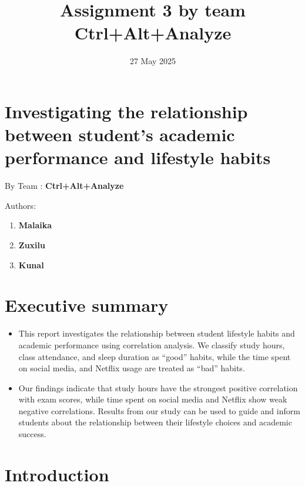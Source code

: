 \documentclass[
  11pt,
  a4paper,
]{article}
\title{Assignment 3 by team Ctrl+Alt+Analyze}
\date{27 May 2025}
\author{\sf{\Large\textbf{Malaika} \\[0.5cm]}{\Large\textbf{Kunal} \\[0.5cm]}{\Large\textbf{ZuxiLu} \\[0.5cm]}}
\makeatletter
\providecommand{\tightlist}{%
  \setlength{\itemsep}{0pt}\setlength{\parskip}{0pt}}\usepackage{longtable,booktabs,array}
\renewcommand*\contentsname{Table of contents}
\newcommand\contentsname{Table of contents}
\def\maketitle{\front{\expandafter{\@title}}{\@author}{\@organization}}
\makeatother
\begin{document}
\maketitle

\renewcommand*\contentsname{Table of contents}
{
\hypersetup{linkcolor=}
\setcounter{tocdepth}{3}
\tableofcontents
}

\newpage

\section{Investigating the relationship between student's academic
performance and lifestyle
habits}\label{investigating-the-relationship-between-students-academic-performance-and-lifestyle-habits}

By Team : \textbf{Ctrl+Alt+Analyze}

Authors:

\begin{enumerate}
\def\labelenumi{\arabic{enumi}.}
\item
  \textbf{Malaika}
\item
  \textbf{Zuxilu}
\item
  \textbf{Kunal}
\end{enumerate}

\section{Executive summary}\label{executive-summary}

\begin{itemize}
\tightlist
\item
  This report investigates the relationship between student lifestyle
  habits and academic performance using correlation analysis. We
  classify study hours, class attendance, and sleep duration as ``good''
  habits, while the time spent on social media, and Netflix usage are
  treated as ``bad'' habits.
\item
  Our findings indicate that study hours have the strongest positive
  correlation with exam scores, while time spent on social media and
  Netflix show weak negative correlations. Results from our study can be
  used to guide and inform students about the relationship between their
  lifestyle choices and academic success.
\end{itemize}

\section{Introduction}\label{introduction}
\end{document}

